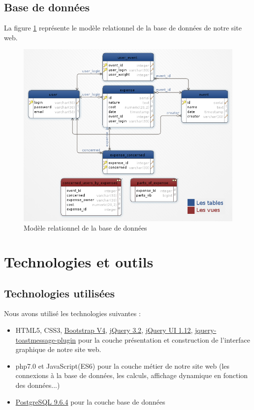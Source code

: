 \documentclass[a4paper, 11pt]{article}
\begin{document}
\subsection{Base de données}
La figure \ref{fig:model_db} représente le modèle relationnel de la base de données de notre site web.
\begin{figure}[!ht]
	\includegraphics[scale=.8]{images/db.png}
	\caption{Modèle relationnel de la base de données}
	\label{fig:model_db}
\end{figure}

\section{Technologies et outils}

\subsection{Technologies utilisées}
Nous avons utilisé les technologies suivantes :
\begin{itemize}
	\item HTML5, CSS3, \href{http://getbootstrap.com/}{Bootstrap V4}, \href{https://jquery.org/}{jQuery 3.2}, 
	\href{https://jqueryui.com/}{jQuery UI 1.12}, \href{http://akquinet.github.io/jquery-toastmessage-plugin/}{jquery-toastmessage-plugin} pour la couche présentation et construction de l'interface graphique de notre site web.
	\item php7.0 et JavaScript(ES6) pour la couche métier de notre site web (les connexions à la base de données, les
	calculs, affichage dynamique en fonction des données...)
	\item \href{https://www.postgresql.org/}{PostgreSQL 9.6.4} pour la couche base de données
\end{itemize}
\end{document}
